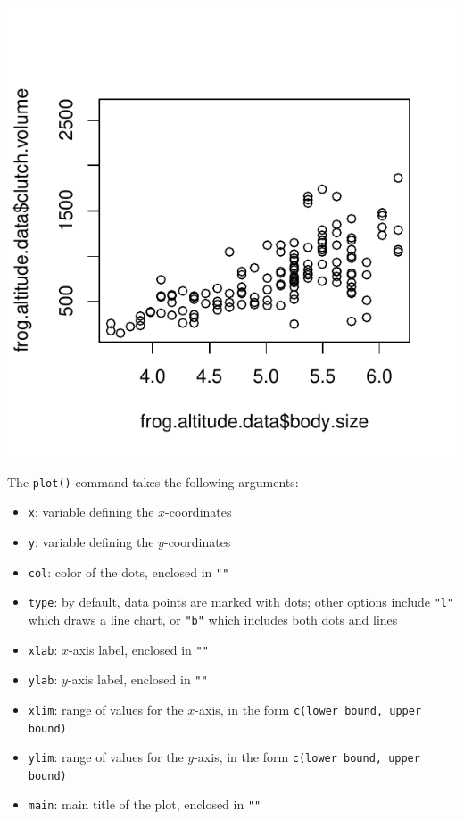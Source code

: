 \begin{knitrout}
\color{fgcolor}\begin{kframe}
\begin{alltt}
\hlopt{$}\hlopt{$}
\end{alltt}
\end{kframe}

{\centering \includegraphics[width=\maxwidth]{figure/unnamed-chunk-23-1} 

}



\end{knitrout}

The \texttt{plot()} command takes the following arguments: 

\begin{itemize}
\item \texttt{x}: variable defining the $x$-coordinates 
\item \texttt{y}: variable defining the $y$-coordinates 
\item \texttt{col}: color of the dots, enclosed in \texttt{""}
\item \texttt{type}: by default, data points are marked with dots; other options include \texttt{"l"} which draws a line chart, or \texttt{"b"} which includes both dots and lines
\item \texttt{xlab}: $x$-axis label, enclosed in \texttt{""}
\item \texttt{ylab}: $y$-axis label, enclosed in \texttt{""}
\item \texttt{xlim}: range of values for the $x$-axis, in the form \texttt{c(lower bound, upper bound)}
\item \texttt{ylim}: range of values for the $y$-axis, in the form \texttt{c(lower bound, upper bound)}
\item \texttt{main}: main title of the plot, enclosed in \texttt{""} 
\end{itemize}

